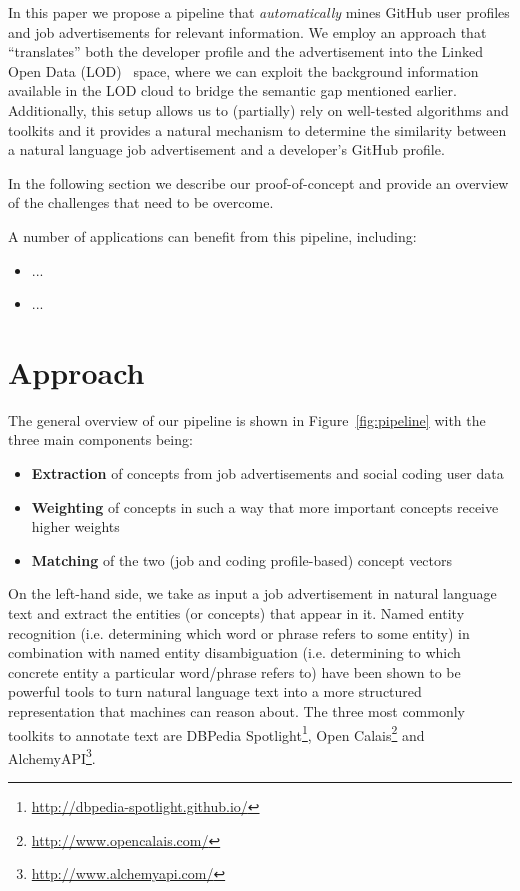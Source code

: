 \documentclass[conference]{IEEEtran}
\begin{document}
In this paper we propose a pipeline that \emph{automatically} mines GitHub user profiles and job advertisements for relevant information. We employ an approach that ``translates'' both the developer profile and the advertisement into the Linked Open Data (LOD)~\cite{bizer2009linked} space, where we can exploit the background information available in the LOD cloud to bridge the semantic gap mentioned earlier. Additionally, this setup allows us to (partially) rely on well-tested algorithms and toolkits and it provides a natural mechanism to determine the similarity between a natural language job advertisement and a developer's GitHub profile. 

In the following section we describe our proof-of-concept and provide an overview of the challenges that need to be overcome.

A number of applications can benefit from this pipeline, including:
\begin{itemize}
\item ...
\item ...
\end{itemize}



\section{Approach}

The general overview of our pipeline is shown in Figure~\ref{fig:pipeline} with the three main components being:
\begin{itemize}
	\item \textbf{Extraction} of concepts from job advertisements and social coding user data
	\item \textbf{Weighting} of concepts in such a way that more important concepts receive higher weights
	\item \textbf{Matching} of the two (job and coding profile-based) concept vectors
\end{itemize}

On the left-hand side, we take as input a job advertisement in natural language text and extract the entities (or concepts) that appear in it. Named entity recognition (i.e. determining which word or phrase refers to some entity) in combination with named entity disambiguation (i.e. determining to which concrete entity a particular word/phrase refers to) have been shown to be powerful tools to turn natural language text into a more structured representation that machines can reason about. The three most commonly toolkits to annotate text are DBPedia Spotlight\footnote{\url{http://dbpedia-spotlight.github.io/}}, Open Calais\footnote{\url{http://www.opencalais.com/}} and AlchemyAPI\footnote{\url{http://www.alchemyapi.com/}}.
\end{document}
